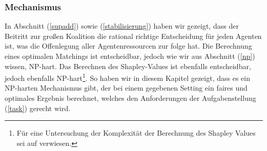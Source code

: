 \subsubsection{Mechanismus}
\label{thmechanism}
In Abschnitt (\ref{supadd}) sowie (\ref{stabilisierung}) haben wir gezeigt, dass der Beitritt zur großen Koalition die rational richtige Entscheidung für jeden Agenten ist, was die Offenlegung aller Agentenressourcen zur folge hat.
Die Berechnung eines optimalen Matchings ist entscheidbar, jedoch wie wir aus Abschnitt (\ref{np}) wissen, NP-hart.
Das Berechnen des Shapley-Values ist ebenfalls entscheidbar, jedoch ebenfalls NP-hart\footnote{Für eine Untersuchung der Komplexität der Berechnung des Shapley Values sei auf \cite{conitzer2004computing} verwiesen.}.
So haben wir in diesem Kapitel gezeigt, dass es ein NP-harten Mechanismus gibt, der bei einem gegebenen Setting ein faires und optimales Ergebnis berechnet, welches den Anforderungen der Aufgabenstellung (\ref{task}) gerecht wird.
